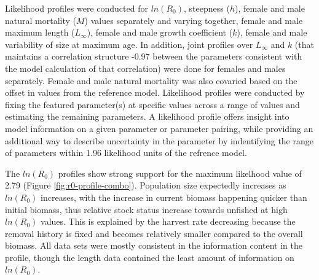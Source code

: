 \documentclass[11pt,
  english,
  a4paper,
]{article}
\begin{document}
Likelihood profiles were conducted for {\(ln(R_0)\)\leavevmode\tagmcend\tagstructend}, steepness ({\(h\)\leavevmode\tagmcend\tagstructend}), female and male natural mortality ({\(M\)\leavevmode\tagmcend\tagstructend}) values separately and varying together, female and male maximum length ({\(L_{\infty}\)\leavevmode\tagmcend\tagstructend}), female and male growth coefficient ({\(k\)\leavevmode\tagmcend\tagstructend}), female and male variability of size at maximum age. In addition, joint profiles over {\(L_{\infty}\)\leavevmode\tagmcend\tagstructend} and {\(k\)\leavevmode\tagmcend\tagstructend} (that maintains a correlation structure -0.97 between the parameters consistent with the model calculation of that correlation) were done for females and males separately. Female and male natural mortality was also covaried based on the offset in values from the reference model. Likelihood profiles were conducted by fixing the featured parameter(s) at specific values across a range of values and estimating the remaining parameters. A likelihood profile offers insight into model information on a given parameter or parameter pairing, while providing an additional way to describe uncertainty in the parameter by indentifying the range of parameters within 1.96 likelihood units of the refrence model.

\leavevmode\tagmcend\tagstructend\par


The {\(ln(R_0)\)\leavevmode\tagmcend\tagstructend} profiles show strong support for the maximum likelhood value of 2.79 (Figure \ref{fig:r0-profile-combo}). Population size expectedly increases as {\(ln(R_0)\)\leavevmode\tagmcend\tagstructend} increases, with the increase in current biomass happening quicker than initial biomass, thus relative stock status increase towards unfished at high {\(ln(R_0)\)\leavevmode\tagmcend\tagstructend} values. This is explained by the harvest rate decreasing because the removal history is fixed and becomes relatively smaller compared to the overall biomass. All data sets were mostly consistent in the information content in the profile, though the length data contained the least amount of information on {\(ln(R_0)\)\leavevmode\tagmcend\tagstructend}.
\end{document}
